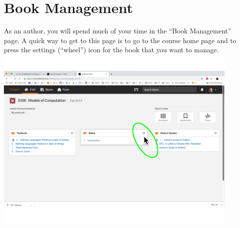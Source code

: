 \section{Book Management}

\begin{gram}
\label{guide::author::go-book-management}
As an author, you will spend much of your time in the ``Book Management'' page.
A quick way to get to this page is to go to the course home page and to press the settings (``wheel'') icon for the book that you want to manage.
%
\includegraphics[width=0.9\textwidth]{author/media/go-to-book-management.pdf}
\end{gram}


